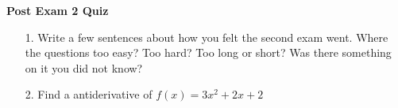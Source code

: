 \documentclass[11pt]{article}
\begin{document}

\centerline{\textbf{\Large{Post Exam 2 Quiz}}}

\vspace{0.2in}
 

\begin{enumerate}

\item[1.] Write a few sentences about how you felt the second exam went. Where the questions too easy? Too hard? Too long or short? Was there something on it you did not know? 

\item[2.] Find a antiderivative of $f(x) = 3x^2 + 2x + 2$

	
\end{enumerate}
 
\end{document}
